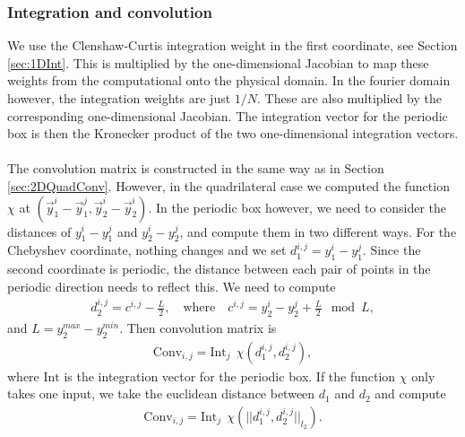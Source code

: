 \documentclass[11pt, a4paper]{article}
\theoremstyle{definition}
\begin{document}
\subsubsection{Integration and convolution}
We use the Clenshaw-Curtis integration weight in the first coordinate, see Section \ref{sec:1DInt}. This is multiplied by the one-dimensional Jacobian to map these weights from the computational onto the physical domain. In the fourier domain however, the integration weights are just $1/N$. These are also multiplied by the corresponding one-dimensional Jacobian. The integration vector for the periodic box is then the Kronecker product of the two one-dimensional integration vectors.
\\
\\
The convolution matrix is constructed in the same way as in Section \ref{sec:2DQuadConv}. However, in the quadrilateral case we computed the function $\chi$ at $\left(\vec {y}_1^{i} - \vec {y}_1^{j}, \vec{y}_2^{i} - \vec {y}_2^{i} \right)$. In the periodic box however, we need to consider the distances of ${y}_1^{i} - {y}_1^{j}$ and ${y}_2^{i} - {y}_2^{j}$, and compute them in two different ways. For the Chebyshev coordinate, nothing changes and we set $d_1^{i,j} = {y}_1^{i} - {y}_1^{j}$. Since the second coordinate is periodic, the distance between each pair of points in the periodic direction needs to reflect this. We need to compute 
\begin{align*}	
	d_2^{i,j} = c^{i,j} - \frac{L}{2}, \quad \text{where} \quad c^{i,j} =  {y}_2^{i} - {y}_2^{j} + \frac{L}{2} \mod L,
\end{align*}
and $L = y_2^{max} - y_2^{min}$. 
Then convolution matrix is
\begin{align*}
	\text{Conv}_{i,j} = \text{Int}_j \ \ \chi(d_1^{i,j}, d_2^{i,j}),
\end{align*}
where $\text{Int}$ is the integration vector for the periodic box.
If the function $\chi$ only takes one input, we take the euclidean distance between $d_1$ and $d_2$ and compute
\begin{align*}
	\text{Conv}_{i,j} = \text{Int}_j \ \ \chi(||d_1^{i,j}, d_2^{i,j}||_{l_2}).
\end{align*}
\end{document}
